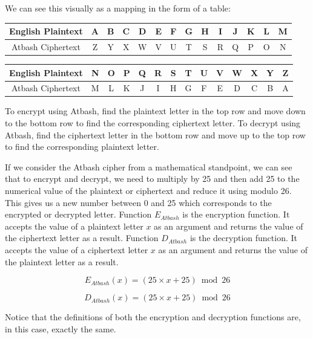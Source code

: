 We can see this visually as a mapping in the form of a table:

\Large
\begin{center}
  \begin{tabular}{|c|c|c|c|c|c|c|c|c|c|c|c|c|c|}
  \hline
    English Plaintext & A & B & C & D & E & F & G & H & I & J & K & L & M \\ \hline
	Atbash Ciphertext & Z & Y & X & W & V & U & T & S & R & Q & P & O & N \\ \hline
  \end{tabular}
\end{center}

\begin{center}
  \begin{tabular}{|c|c|c|c|c|c|c|c|c|c|c|c|c|c|}
  \hline
    English Plaintext & N & O & P & Q & R & S & T & U & V & W & X & Y & Z \\ \hline
    Atbash Ciphertext & M & L & K & J & I & H & G & F & E & D & C & B & A \\ \hline
  \end{tabular}
\end{center}

\normalsize

To encrypt using Atbash, find the plaintext letter in the top row and move down to the bottom row to find the corresponding ciphertext letter. To decrypt using Atbash, find the ciphertext letter in the bottom row and move up to the top row to find the corresponding plaintext letter.

If we consider the Atbash cipher from a mathematical standpoint, we can see that to encrypt and decrypt, we need to multiply by 25 and then add 25 to the numerical value of the plaintext or ciphertext and reduce it using modulo 26. This gives us a new number between 0 and 25 which corresponds to the encrypted or decrypted letter. Function $E_{Atbash}$ is the encryption function. It accepts the value of a plaintext letter $x$ as an argument and returns the value of the ciphertext letter as a result. Function $D_{Atbash}$ is the decryption function. It accepts the value of a ciphertext letter $x$ as an argument and returns the value of the plaintext letter as a result. 

\[
  E_{Atbash}(x) = (25 \times x + 25) \bmod 26
\]

\[
  D_{Atbash}(x) = (25 \times x + 25) \bmod 26
\]

Notice that the definitions of both the encryption and decryption functions are, in this case, exactly the same. 

